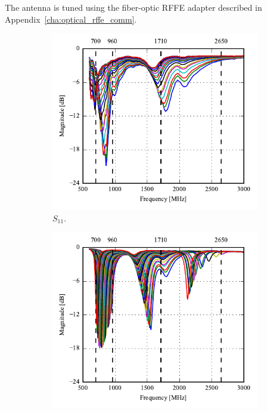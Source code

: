 The antenna is tuned using the fiber-optic RFFE adapter described in Appendix~\ref{cha:optical_rffe_comm}.

\begin{figure}[htbp]
    \centering
    \begin{subfigure}{0.49\linewidth}
        \includegraphics{img/tech_sol/pcb_trianglefeed/S11}
        \caption{$S_{11}$.}
    \end{subfigure}
    \hfill
    \begin{subfigure}{0.49\linewidth}
        \includegraphics{img/tech_sol/pcb_trianglefeed/S22}

\end{subfigure}
\end{figure}
